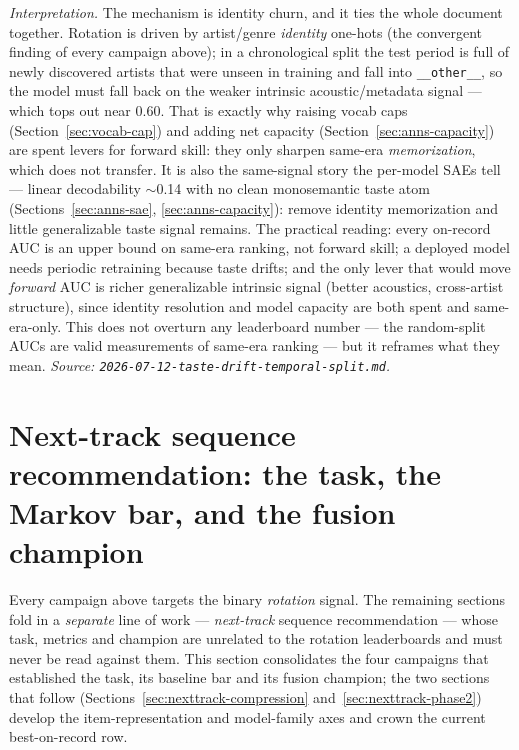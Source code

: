 \documentclass[11pt]{article}
\begin{document}
\emph{Interpretation.} The mechanism is identity churn, and it ties the whole
document together. Rotation is driven by artist/genre \emph{identity} one-hots
(the convergent finding of every campaign above); in a chronological split the
test period is full of newly discovered artists that were unseen in training and
fall into \texttt{\_\_other\_\_}, so the model must fall back on the weaker
intrinsic acoustic/metadata signal --- which tops out near \num{0.60}. That is
exactly why raising vocab caps (Section~\ref{sec:vocab-cap}) and adding net
capacity (Section~\ref{sec:anns-capacity}) are spent levers for forward skill:
they only sharpen same-era \emph{memorization}, which does not transfer. It is
also the same-signal story the per-model SAEs tell --- linear decodability
$\sim$0.14 with no clean monosemantic taste atom (Sections~\ref{sec:anns-sae},
\ref{sec:anns-capacity}): remove identity memorization and little generalizable
taste signal remains. The practical reading: every on-record AUC is an upper
bound on same-era ranking, not forward skill; a deployed model needs periodic
retraining because taste drifts; and the only lever that would move
\emph{forward} AUC is richer generalizable intrinsic signal (better acoustics,
cross-artist structure), since identity resolution and model capacity are both
spent and same-era-only. This does not overturn any leaderboard number --- the
random-split AUCs are valid measurements of same-era ranking --- but it reframes
what they mean. \emph{Source:
\texttt{2026-07-12-taste-drift-temporal-split.md}.}

\section{Next-track sequence recommendation: the task, the Markov bar, and the fusion champion}
\label{sec:nexttrack}
Every campaign above targets the binary \emph{rotation} signal. The remaining
sections fold in a \emph{separate} line of work --- \emph{next-track} sequence
recommendation --- whose task, metrics and champion are unrelated to the
rotation leaderboards and must never be read against them. This section
consolidates the four campaigns that established the task, its baseline bar and
its fusion champion; the two sections that follow
(Sections~\ref{sec:nexttrack-compression} and~\ref{sec:nexttrack-phase2})
develop the item-representation and model-family axes and crown the current
best-on-record row.
\end{document}
